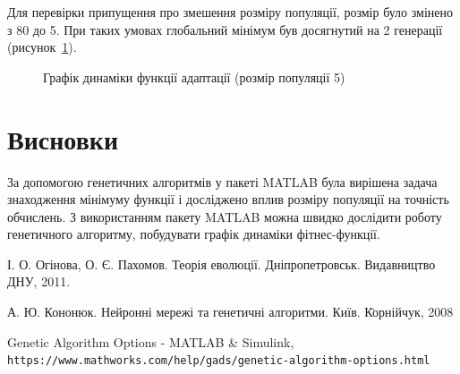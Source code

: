 Для перевірки припущення про змешення розміру популяції, розмір було змінено з 80 до 5. При таких умовах глобальний мінімум був досягнутий на 2 генерації (рисунок~\ref{fig:plot_dynamic_2}). 

\begin{figure}[H]
  \centering
{}
  \captionsetup{justification=centering}
  \caption{Графік динаміки функції адаптації (розмір популяції 5)}
  \label{fig:plot_dynamic_2}
\end{figure}

%
%
\section*{Висновки} 
За допомогою генетичних алгоритмів у пакеті MATLAB була вирішена задача знаходження мінімуму функції і досліджено вплив  розміру популяції на точність обчислень. З використанням пакету MATLAB можна швидко дослідити роботу генетичного алгоритму, побудувати графік динаміки фітнес-функції. 

%
%
\renewcommand{\bibsection}{\section*{Список джерел інформації}}
\clearpage
{}
\begin{thebibliography}{9}
І. О. Огінова, О. Є. Пахомов. 
Теорія еволюції. 
Дніпропетровськ. Видавництво ДНУ, 2011.
 
А. Ю. Кононюк.
Нейронні мережі та генетичні алгоритми. 
Київ. \"{Корнійчук}, 2008
 
Genetic Algorithm Options - MATLAB \& Simulink,
\\\texttt{https://www.mathworks.com/help/gads/genetic-algorithm-options.html}
\end{thebibliography}

